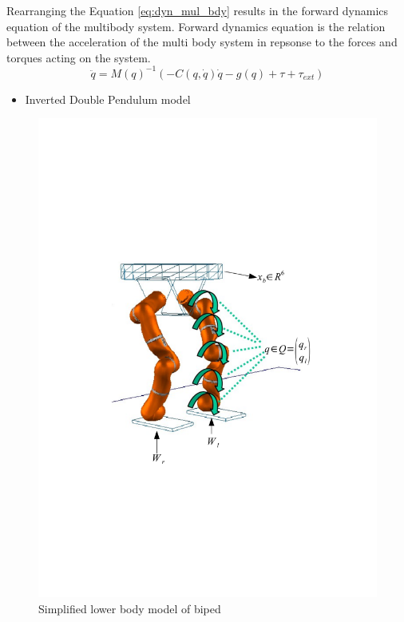 Rearranging the Equation \ref{eq:dyn_mul_bdy} results in the forward dynamics equation of the multibody system. Forward dynamics equation is the relation between the acceleration of the multi body system in repsonse to the forces and torques acting on the system.
\begin{equation}
    \label{eq:fwdyn}
    \ddot{q} = M(q)^{-1} (- C(q,\dot{q})\dot{q} -g(q) + \tau + \tau_{ext})
\end{equation}
\begin{itemize}
\item Inverted Double Pendulum model
\end{itemize}

\begin{figure}
\begin{center}
\includegraphics[trim= 10mm 80mm 10mm 80mm,scale=0.75]{Bilder/model_biped.pdf}
\caption{Simplified lower body model of biped}
\label{fig:biped_simplelow}
\end{center}
\end{figure}
